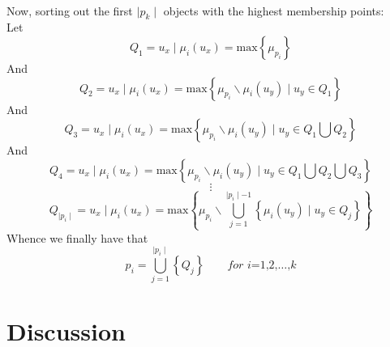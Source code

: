 \documentclass{article}
\begin{document}
		\paragraph{}
			Now, sorting out the first $\mid p_k \mid$ objects with the highest membership points:\\
			Let
				\[
					Q_1 = u_x \mid \mu_i(u_x) = \text{max}\left\{ \mu_{p_i} \right\}
				\]
			And
				\[
					Q_2 = u_x \mid \mu_i(u_x) = \text{max}\left\{ \mu_{p_i} \backslash \mu_i(u_y) \mid u_y \in Q_1 \right\}
				\]
			And
				\[
					Q_3 = u_x \mid \mu_i(u_x) = \text{max}\left\{ \mu_{p_i} \backslash \mu_i(u_y) \mid u_y \in Q_1 \bigcup Q_2 \right\}
				\]
			And
				\[
					Q_4 = u_x \mid \mu_i(u_x) = \text{max}\left\{ \mu_{p_i} \backslash \mu_i(u_y) \mid u_y \in Q_1 \bigcup Q_2 \bigcup Q_3 \right\}
				\]
				\[
					\vdots
				\]
				\[
					Q_{\mid p_i \mid} = u_x \mid \mu_i(u_x) = \text{max}\left\{ \mu_{p_i} \backslash \bigcup_{j=1}^{\mid p_i \mid - 1} \left\{  \mu_i(u_y) \mid u_y \in Q_j \right\} \right\}
				\]
			Whence we finally have that
				\[
					p_i = \bigcup_{j=1}^{\mid p_i \mid}\left\{Q_j\right\} \qquad \textit{for i=1,2,}\dots\text{,}k
				\]
		\newpage
	\section{Discussion}
\end{document}
